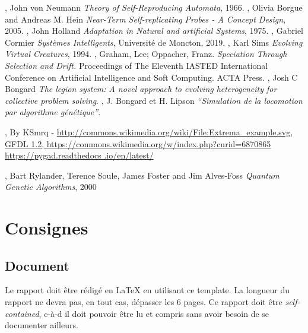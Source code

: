 \documentclass[journal, a4paper]{IEEEtran}
\begin{document}
%
%
%
\begin{thebibliography}{99}
	 , John von Neumann
	\textit{Theory of Self-Reproducing Automata}, 1966.
	 , Olivia Borgue and Andreas M.
	Hein \textit{Near-Term Self-replicating Probes - A Concept Design}, 2005.
	 , John Holland \textit{Adaptation in
	Natural
	and artificial Systems}, 1975.
	 , Gabriel Cormier \textit{Systèmes Intelligents}, Université de Moncton, 2019.
	 , Karl Sims \textit{Evolving Virtual Creatures}, 1994.
	 , Graham, Lee; Oppacher, Franz. \textit{
	Speciation Through Selection and Drift. } Proceedings of The Eleventh IASTED International Conference on Artificial Intelligence and Soft Computing. ACTA Press.
	 , Josh C Bongard \textit{The legion
	system: A novel approach to evolving heterogeneity for collective problem solving}.
	 , J. Bongard et H. Lipson \textit{“Simulation de la locomotion par algorithme génétique”}.

	 , By KSmrq -  \url{http://commons.wikimedia.org/wiki/File:Extrema_example.svg, GFDL 1.2, https://commons.wikimedia.org/w/index.php?curid=6870865}
	 \url{https://pygad.readthedocs
	.io/en/latest/}

	 , Bart Rylander, Terence Soule,
	James Foster and Jim Alves-Foss \textit{Quantum Genetic Algorithms}, 2000
\end{thebibliography}


\newpage

\appendices
\section{Consignes}\label{sec:consignes}
\subsection*{Document}
	Le rapport doit être rédigé en \LaTeX{} en utilisant ce template.
	La longueur du rapport ne devra pas, en tout cas, dépasser les 6 pages.
	Ce rapport doit être \emph{self-contained}, c-à-d il doit pouvoir être lu et compris sans avoir besoin de se documenter ailleurs.



\end{document}

